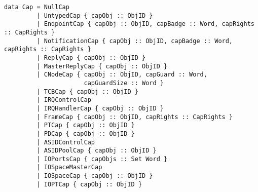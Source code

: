 \documentclass[a4paper,12pt]{article}
\begin{document}
{\small
\begin{verbatim}
data Cap = NullCap
         | UntypedCap { capObj :: ObjID } 
         | EndpointCap { capObj :: ObjID, capBadge :: Word, capRights :: CapRights }
         | NotificationCap { capObj :: ObjID, capBadge :: Word, capRights :: CapRights }
         | ReplyCap { capObj :: ObjID }
         | MasterReplyCap { capObj :: ObjID }
         | CNodeCap { capObj :: ObjID, capGuard :: Word, 
                      capGuardSize :: Word }
         | TCBCap { capObj :: ObjID }
         | IRQControlCap 
         | IRQHandlerCap { capObj :: ObjID }
         | FrameCap { capObj :: ObjID, capRights :: CapRights } 
         | PTCap { capObj :: ObjID } 
         | PDCap { capObj :: ObjID }
         | ASIDControlCap 
         | ASIDPoolCap { capObj :: ObjID }
         | IOPortsCap { capObjs :: Set Word }
         | IOSpaceMasterCap 
         | IOSpaceCap { capObj :: ObjID }
         | IOPTCap { capObj :: ObjID }
\end{verbatim}}
\end{document}
